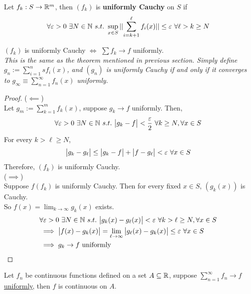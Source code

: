 \documentclass[11pt]{article}
\begin{document}
 	\begin{definition}
 		Let $f_k: S \to \mathbb{R}^m$, then $(f_k)$ is \textbf{uniformly Cauchy} on $S$ if 
 		\begin{align}
 			\forall \varepsilon > 0\ \exists N \in \mathbb{N}\ s.t.\ \sup_{x \in S} \vert \vert {\sum_{i=k+1}^\ell f_i(x)} \vert \vert \leq \varepsilon\ \forall \ell > k \geq N
 		\end{align}
 	\end{definition}
 	
 	\begin{theorem}
 		$(f_k)$ is uniformly Cauchy $\iff$ $\sum f_k \to f$ uniformly. \\
 		\emph{This is the same as the theorem mentioned in previous section. Simply define $g_n := \sum_{i=1}^ns f_i(x)$, and $(g_n)$ is uniformly Cauchy if and only if it converges to $g_\infty \equiv \sum_{n=1}^\infty f_n(x)$ uniformly.}
 	\end{theorem}
 	\begin{proof}
 		($\impliedby$)\\
 		Let $g_m := \sum_{k=1}^m f_k(x)$, suppose $g_k \to f$ uniformly. Then, 
 		\begin{align}
 			\forall \varepsilon > 0\ \exists N \in \mathbb{N}\ s.t.\ \big \vert {g_k - f} \big \vert < \frac{\varepsilon}{2}\ \forall k \geq N, \forall x \in S
 		\end{align}
 		For every $k > \ell \geq N$,
 		\begin{align}
 			\big \vert {g_k - g_\ell} \big \vert \leq \big \vert {g_k - f} \big \vert + \big \vert {f - g_\ell} \big \vert < \varepsilon\ \forall x \in S
 		\end{align}
 		Therefore, $(f_k)$ is uniformly Cauchy. \\
 		($\implies$) \\
 		Suppose $f(f_k)$ is uniformly Cauchy. Then for every fixed $x \in S$, $(g_k(x))$ is Cauchy. \\
 		So $f(x) = \lim_{k \to \infty} g_k(x)$ exists.
 		\begin{align}
 			&\forall \varepsilon > 0\ \exists N \in \N\ s.t.\ \abs{g_k(x) - g_\ell(x)} < \varepsilon\ \forall k > \ell \geq N,\forall x \in S \\
 			&\implies \abs{f(x) - g_k(x)} = \lim_{\ell \to \infty} \abs{g_\ell(x) - g_k(x)} \leq \varepsilon\ \forall x \in S\\
 			&\implies g_k \to f \tx{ uniformly}
 		\end{align}
 	\end{proof}
 	
 	\begin{theorem}
 		Let $f_n$ be continuous functions defined on a set $A \subseteq \mathbb{R}$, suppose $\sum^\infty_{n=1} f_n \to f$ \ul{uniformly}, then $f$ is continuous on $A$.
 	\end{theorem}
 	
\end{document}
